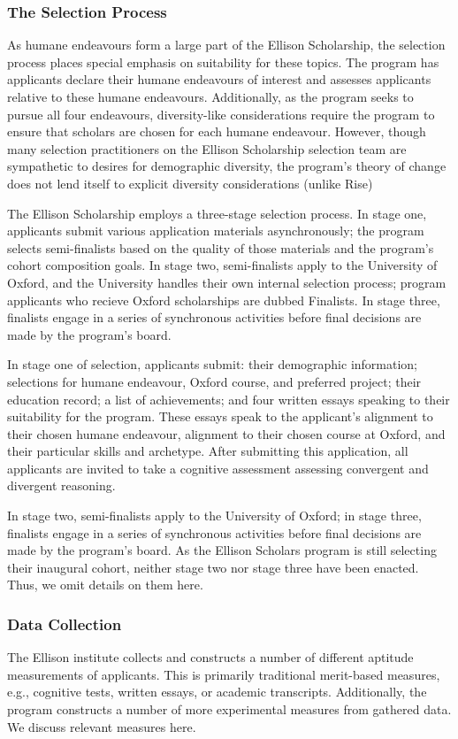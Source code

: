 \subsubsection{The Selection Process}
As humane endeavours form a large part of the Ellison Scholarship, the selection process places special emphasis on suitability for these topics. The program has applicants declare their humane endeavours of interest and assesses applicants relative to these humane endeavours. Additionally, as the program seeks to pursue all four endeavours, diversity-like considerations require the program to ensure that scholars are chosen for each humane endeavour. However, though many selection practitioners on the Ellison Scholarship selection team are sympathetic to desires for demographic diversity, the program's theory of change does not lend itself to explicit diversity considerations (unlike Rise)

The Ellison Scholarship employs a three-stage selection process. In stage one, applicants submit various application materials asynchronously; the program selects semi-finalists based on the quality of those materials and the program's cohort composition goals. In stage two, semi-finalists apply to the University of Oxford, and the University handles their own internal selection process; program applicants who recieve Oxford scholarships are dubbed Finalists. In stage three, finalists engage in a series of synchronous activities before final decisions are made by the program's board. 

In stage one of selection, applicants submit: their demographic information; selections for humane endeavour, Oxford course, and preferred project; their education record; a list of achievements; and four written essays speaking to their suitability for the program. These essays speak to the applicant's alignment to their chosen humane endeavour, alignment to their chosen course at Oxford, and their particular skills and archetype. After submitting this application, all applicants are invited to take a cognitive assessment assessing convergent and divergent reasoning.

In stage two, semi-finalists apply to the University of Oxford; in stage three, finalists engage in a series of synchronous activities before final decisions are made by the program's board. As the Ellison Scholars program is still selecting their inaugural cohort, neither stage two nor stage three have been enacted. Thus, we omit details on them here. 

\subsubsection{Data Collection}
The Ellison institute collects and constructs a number of different aptitude measurements of applicants. This is primarily traditional merit-based measures, e.g., cognitive tests, written essays, or academic transcripts. Additionally, the program constructs a number of more experimental measures from gathered data. We discuss relevant measures here.

